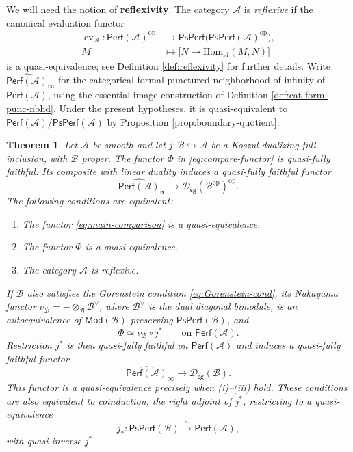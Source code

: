 \documentclass[11pt,letterpaper,reqno]{amsart}
\theoremstyle{plain}
\theoremstyle{definition}
\theoremstyle{plain}
\newtheorem{maintheorem}{Theorem}
\theoremstyle{definition}
\numberwithin{equation}{section}
\begin{document}
We will need the notion of \textbf{reflexivity}.
The category $\mathscr A$ is \emph{reflexive} if the canonical evaluation functor
\[
\begin{aligned}
\operatorname{ev}_{\mathscr A}:
\mathsf{Perf}(\mathscr A)^{\mathrm{op}}
&\longrightarrow\mathsf{PsPerf}\bigl(\mathsf{PsPerf}(\mathscr A)^{\mathrm{op}}\bigr),\\
M&\longmapsto\bigl[N\longmapsto\mathrm{Hom}_{\mathscr A}(M,N)\bigr]
\end{aligned}
\]
is a quasi-equivalence; see Definition \ref{def:reflexivity} for further details.
Write $\widehat{\mathsf{Perf}(\mathscr A)}_\infty$ for the categorical formal punctured neighborhood of infinity of $\mathsf{Perf}(\mathscr A)$, using the essential-image construction of Definition \ref{def:cat-form-punc-nbhd}.
Under the present hypotheses, it is quasi-equivalent to $\mathsf{Perf}(\mathscr A)/\mathsf{PsPerf}(\mathscr A)$ by Proposition \ref{prop:boundary-quotient}.

\begin{maintheorem}\label{thm:main}
Let $\mathscr A$ be smooth and let $j:\mathscr B\hookrightarrow\mathscr A$ be a Koszul-dualizing full inclusion, with $\mathscr B$ proper.
The functor $\Phi$ in \eqref{eq:compare-functor} is quasi-fully faithful.
Its composite with linear duality induces a quasi-fully faithful functor
\begin{equation}\label{eq:main-comparison}
\widehat{\mathsf{Perf}(\mathscr A)}_\infty
\longrightarrow\mathscr D_{\mathsf{sg}}(\mathscr B^{\mathrm{op}})^{\mathrm{op}}.
\end{equation}
The following conditions are equivalent:
\begin{enumerate}
    \item[(i)] The functor \eqref{eq:main-comparison} is a quasi-equivalence.
    \item[(ii)] The functor $\Phi$ is a quasi-equivalence.
    \item[(iii)] The category $\mathscr A$ is reflexive.
\end{enumerate}
If $\mathscr B$ also satisfies the Gorenstein condition \eqref{eq:Gorenstein-cond}, its Nakayama functor $\nu_{\mathscr B}=-\otimes_{\mathscr B}\mathscr B^\vee$, where $\mathscr B^\vee$ is the dual diagonal bimodule, is an autoequivalence of $\mathsf{Mod}(\mathscr B)$ preserving $\mathsf{PsPerf}(\mathscr B)$, and
\[
\Phi\simeq\nu_{\mathscr B}\circ j^*
\qquad\text{on }\mathsf{Perf}(\mathscr A).
\]
Restriction $j^*$ is then quasi-fully faithful on $\mathsf{Perf}(\mathscr A)$ and induces a quasi-fully faithful functor
\begin{equation}\label{eq:ordinary-comparison}
\widehat{\mathsf{Perf}(\mathscr A)}_\infty
\longrightarrow\mathscr D_{\mathsf{sg}}(\mathscr B).
\end{equation}
This functor is a quasi-equivalence precisely when \textup{(i)--(iii)} hold.
These conditions are also equivalent to coinduction, the right adjoint of $j^*$, restricting to a quasi-equivalence
\[
j_*:\mathsf{PsPerf}(\mathscr B)\xrightarrow{\;\sim\;}\mathsf{Perf}(\mathscr A),
\]
with quasi-inverse $j^*$.
\end{maintheorem}
\end{document}
